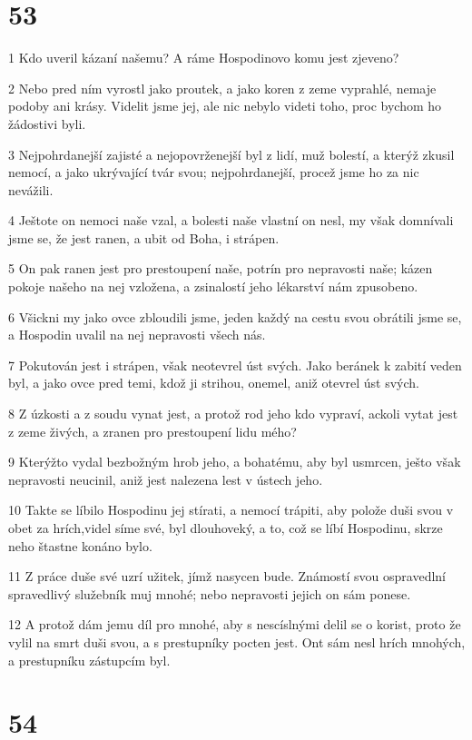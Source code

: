 \chapter{53}

\par 1 Kdo uveril kázaní našemu? A ráme Hospodinovo komu jest zjeveno?
\par 2 Nebo pred ním vyrostl jako proutek, a jako koren z zeme vyprahlé, nemaje podoby ani krásy. Videlit jsme jej, ale nic nebylo videti toho, proc bychom ho žádostivi byli.
\par 3 Nejpohrdanejší zajisté a nejopovrženejší byl z lidí, muž bolestí, a kterýž zkusil nemocí, a jako ukrývající tvár svou; nejpohrdanejší, procež jsme ho za nic nevážili.
\par 4 Ještote on nemoci naše vzal, a bolesti naše vlastní on nesl, my však domnívali jsme se, že jest ranen, a ubit od Boha, i strápen.
\par 5 On pak ranen jest pro prestoupení naše, potrín pro nepravosti naše; kázen pokoje našeho na nej vzložena, a zsinalostí jeho lékarství nám zpusobeno.
\par 6 Všickni my jako ovce zbloudili jsme, jeden každý na cestu svou obrátili jsme se, a Hospodin uvalil na nej nepravosti všech nás.
\par 7 Pokutován jest i strápen, však neotevrel úst svých. Jako beránek k zabití veden byl, a jako ovce pred temi, kdož ji strihou, onemel, aniž otevrel úst svých.
\par 8 Z úzkosti a z soudu vynat jest, a protož rod jeho kdo vypraví, ackoli vytat jest z zeme živých, a zranen pro prestoupení lidu mého?
\par 9 Kterýžto vydal bezbožným hrob jeho, a bohatému, aby byl usmrcen, ješto však nepravosti neucinil, aniž jest nalezena lest v ústech jeho.
\par 10 Takte se líbilo Hospodinu jej stírati, a nemocí trápiti, aby polože duši svou v obet za hrích,videl síme své, byl dlouhoveký, a to, což se líbí Hospodinu, skrze neho štastne konáno bylo.
\par 11 Z práce duše své uzrí užitek, jímž nasycen bude. Známostí svou ospravedlní spravedlivý služebník muj mnohé; nebo nepravosti jejich on sám ponese.
\par 12 A protož dám jemu díl pro mnohé, aby s nescíslnými delil se o korist, proto že vylil na smrt duši svou, a s prestupníky pocten jest. Ont sám nesl hrích mnohých, a prestupníku zástupcím byl.

\chapter{54}

